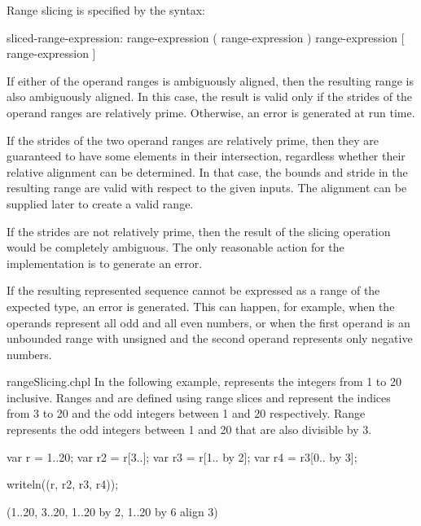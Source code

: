 Range slicing is specified by the syntax:
\begin{syntax}
sliced-range-expression:
  range-expression ( range-expression )
  range-expression [ range-expression ]
\end{syntax}

If either of the operand ranges is ambiguously aligned, then the resulting range
is also ambiguously aligned.  In this case, the result is valid only if the
strides of the operand ranges are relatively prime.  Otherwise, an error is
generated at run time.

\begin{rationale}
If the strides of the two operand ranges are relatively prime, then they are
guaranteed to have some elements in their intersection, regardless whether their
relative alignment can be determined.  In that case, the bounds and stride in the resulting
range are valid with respect to the given inputs.
The alignment can be supplied later to create a valid range.

If the strides are not relatively prime, then the result of the slicing
operation would be completely ambiguous.  The only reasonable action for the
implementation is to generate an error.
\end{rationale}

If the resulting represented sequence cannot be expressed as a range of the
expected type, an error is generated. This can happen, for example, when
the operands represent all odd and all even numbers, or when the first
operand is an unbounded range with unsigned  and the second
operand represents only negative numbers.

\begin{chapelexample}{rangeSlicing.chpl}
In the following example,  represents the integers from 1 to
20 inclusive.  Ranges  and  are defined using range
slices and represent the indices from 3 to 20 and the odd integers
between 1 and 20 respectively. Range  represents the odd
integers between 1 and 20 that are also divisible by 3.
\begin{chapel}
var r = 1..20;
var r2 = r[3..];
var r3 = r[1.. by 2];
var r4 = r3[0.. by 3];
\end{chapel}
\begin{chapelpost}
writeln((r, r2, r3, r4));
\end{chapelpost}
\begin{chapeloutput}
(1..20, 3..20, 1..20 by 2, 1..20 by 6 align 3)
\end{chapeloutput}
\end{chapelexample}


